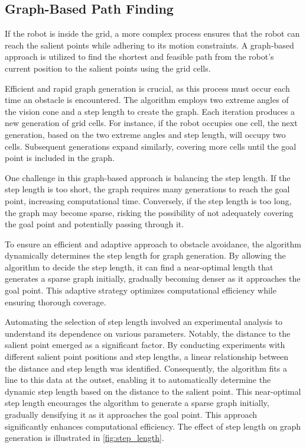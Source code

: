 \subsection{Graph-Based Path Finding}

If the robot is inside the grid, a more complex process ensures that the robot can reach the salient points while adhering to its motion constraints. A graph-based approach is utilized to find the shortest and feasible path from the robot's current position to the salient points using the grid cells.

\vspace{3mm}  

Efficient and rapid graph generation is crucial, as this process must occur each time an obstacle is encountered. The algorithm employs two extreme angles of the vision cone and a step length to create the graph. Each iteration produces a new generation of grid cells. For instance, if the robot occupies one cell, the next generation, based on the two extreme angles and step length, will occupy two cells. Subsequent generations expand similarly, covering more cells until the goal point is included in the graph.

\vspace{3mm}  

One challenge in this graph-based approach is balancing the step length. If the step length is too short, the graph requires many generations to reach the goal point, increasing computational time. Conversely, if the step length is too long, the graph may become sparse, risking the possibility of not adequately covering the goal point and potentially passing through it.


\vspace{3mm}  





To ensure an efficient and adaptive approach to obstacle avoidance, the algorithm dynamically determines the step length for graph generation. By allowing the algorithm to decide the step length, it can find a near-optimal length that generates a sparse graph initially, gradually becoming denser as it approaches the goal point. This adaptive strategy optimizes computational efficiency while ensuring thorough coverage.

\vspace{3mm}  

Automating the selection of step length involved an experimental analysis to understand its dependence on various parameters. Notably, the distance to the salient point emerged as a significant factor. By conducting experiments with different salient point positions and step lengths, a linear relationship between the distance and step length was identified. Consequently, the algorithm fits a line to this data at the outset, enabling it to automatically determine the dynamic step length based on the distance to the salient point. This near-optimal step length encourages the algorithm to generate a sparse graph initially, gradually densifying it as it approaches the goal point. This approach significantly enhances computational efficiency. The effect of step length on graph generation is illustrated in \autoref{fig:step_length}.

